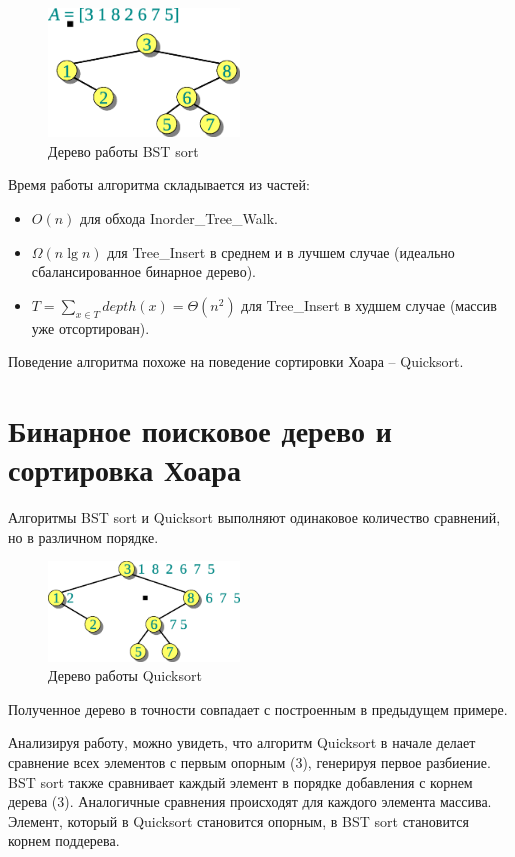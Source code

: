 \documentclass[11pt]{article}
\begin{document}
\begin{figure}[ht]
  \centering
  \includegraphics[width=2in]{lecture10/bs_tree.eps}
  \caption{Дерево работы BST sort}
  \label{fig:bs_tree}
\end{figure}

Время работы алгоритма складывается из частей:
\begin{itemize}
\item $O(n)$ для обхода Inorder\_Tree\_Walk.
\item $\Omega(n \lg n)$ для Tree\_Insert в среднем и в лучшем случае (идеально
  сбалансированное бинарное дерево).
\item $T = \sum_{x \in T} depth(x) = \Theta(n^2)$ для Tree\_Insert в худшем
  случае (массив уже отсортирован).
\end{itemize}

Поведение алгоритма похоже на поведение сортировки Хоара -- Quicksort.

\section{Бинарное поисковое дерево и сортировка Хоара}
Алгоритмы BST sort и Quicksort выполняют одинаковое количество сравнений, но в
различном порядке.
\begin{figure}[ht]
  \centering
  \includegraphics[width=2in]{lecture10/qs_tree.eps}
  \caption{Дерево работы Quicksort}
  \label{fig:qs_tree}
\end{figure}

Полученное дерево в точности совпадает с построенным в предыдущем примере.

Анализируя работу, можно увидеть, что алгоритм Quicksort в начале делает
сравнение всех элементов с первым опорным (3), генерируя первое разбиение.
BST sort также сравнивает каждый элемент в порядке добавления с корнем дерева
(3). Аналогичные сравнения происходят для каждого элемента массива.
Элемент, который в Quicksort становится опорным, в BST sort становится корнем
поддерева.
\end{document}
